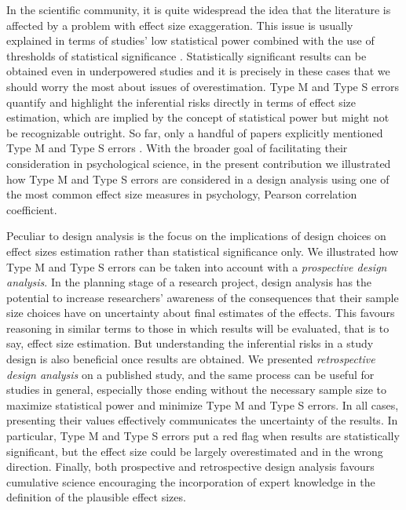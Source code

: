 \documentclass{article}\usepackage[]{graphicx}\usepackage[]{color}
\begin{document}
In the scientific community, it is quite widespread the idea that the literature is affected by a problem with effect size exaggeration. This issue is usually explained in terms of studies’ low statistical power combined with the use of thresholds of statistical significance \parencite{buttonPowerFailureWhy2013,ioannidisWhyMostDiscovered2008,ioannidisEmergenceLargeTreatment2013,laneEstimatingEffectSize1978,yarkoniBigCorrelationsLittle2009,youngWhyCurrentPublication2008}. Statistically significant results can be obtained even in underpowered studies and it is precisely in these cases that we should worry the most about issues of overestimation. Type M and Type S errors quantify and highlight the inferential risks directly in terms of effect size estimation, which are implied by the concept of statistical power but might not be recognizable outright. So far, only a handful of papers explicitly mentioned Type M and Type S errors \parencite{altoeEnhancingStatisticalInference2020,gelmanFailureNullHypothesis2018,gelmanTypeErrorMight2017,gelmanRetrospectiveDesignAnalysis2013,gelmanPowerCalculationsAssessing2014,gelmanTypeErrorRates2000,luNoteTypeErrors2018,vasishthStatisticalSignificanceFilter2018}. With the broader goal of facilitating their consideration in psychological science, in the present contribution we illustrated how Type M and Type S errors are considered in a design analysis using one of the most common effect size measures in psychology, Pearson correlation coefficient.

Peculiar to design analysis is the focus on the implications of design choices on effect sizes estimation rather than statistical significance only. We illustrated how Type M and Type S errors can be taken into account with a \emph{prospective design analysis}. In the planning stage of a research project, design analysis has the potential to increase researchers’ awareness of the consequences that their sample size choices have on uncertainty about final estimates of the effects. This favours reasoning in similar terms to those in which results will be evaluated, that is to say, effect size estimation. But understanding the inferential risks in a study design is also beneficial once results are obtained. We presented \emph{retrospective design analysis} on a published study, and the same process can be useful for studies in general, especially those ending without the necessary sample size to maximize statistical power and minimize Type M and Type S errors. In all cases, presenting their values effectively communicates the uncertainty of the results. In particular, Type M and Type S errors put a red flag when results are statistically significant, but the effect size could be largely overestimated and in the wrong direction. Finally, both prospective and retrospective design analysis favours cumulative science encouraging the incorporation of expert knowledge in the definition of the plausible effect sizes.
\end{document}
